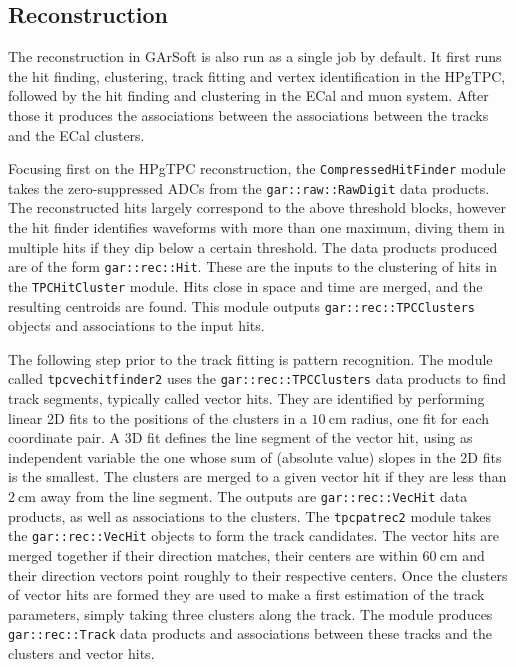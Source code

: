 \subsection{Reconstruction}

The reconstruction in GArSoft is also run as a single job by default. It first runs the hit finding, clustering, track fitting and vertex identification in the HPgTPC, followed by the hit finding and clustering in the ECal and muon system. After those it produces the associations between the associations between the tracks and the ECal clusters.

Focusing first on the HPgTPC reconstruction, the \texttt{CompressedHitFinder} module takes the zero-suppressed ADCs from the \texttt{gar::raw::RawDigit} data products. The reconstructed hits largely correspond to the above threshold blocks, however the hit finder identifies waveforms with more than one maximum, diving them in multiple hits if they dip below a certain threshold. The data products produced are of the form \texttt{gar::rec::Hit}. These are the inputs to the clustering of hits in the \texttt{TPCHitCluster} module. Hits close in space and time are merged, and the resulting centroids are found. This module outputs \texttt{gar::rec::TPCClusters} objects and associations to the input hits.

The following step prior to the track fitting is pattern recognition. The module called \texttt{tpcvechitfinder2} uses the \texttt{gar::rec::TPCClusters} data products to find track segments, typically called vector hits. They are identified by performing linear 2D fits to the positions of the clusters in a $10~\mathrm{cm}$ radius, one fit for each coordinate pair. A 3D fit defines the line segment of the vector hit, using as independent variable the one whose sum of (absolute value) slopes in the 2D fits is the smallest. The clusters are merged to a given vector hit if they are less than $2~\mathrm{cm}$ away from the line segment. The outputs are \texttt{gar::rec::VecHit} data products, as well as associations to the clusters. The \texttt{tpcpatrec2} module takes the \texttt{gar::rec::VecHit} objects to form the track candidates. The vector hits are merged together if their direction matches, their centers are within $60~\mathrm{cm}$ and their direction vectors point roughly to their respective centers. Once the clusters of vector hits are formed they are used to make a first estimation of the track parameters, simply taking three clusters along the track. The module produces \texttt{gar::rec::Track} data products and associations between these tracks and the clusters and vector hits.


